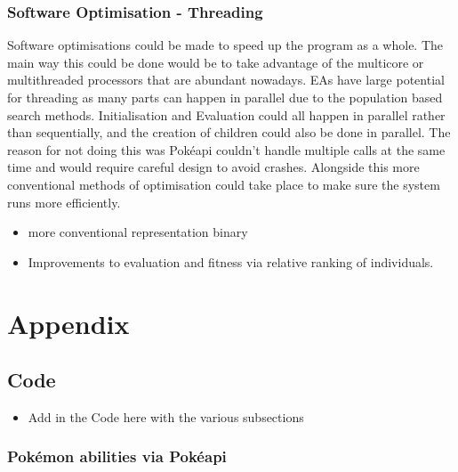 \documentclass[a4paper]{article}
\newcommand{\Pokemon}{Pok\'{e}mon}
\newcommand{\Pokeapi}{Pok\'{e}api}
\begin{document}
\subsubsection{Software Optimisation - Threading}
\par
Software optimisations could be made to speed up the program as a whole.
The main way this could be done would be to take advantage of the multicore or multithreaded processors that are abundant nowadays.
EAs have large potential for threading as many parts can happen in parallel due to the population based search methods.
Initialisation and Evaluation could all happen in parallel rather than sequentially, and the creation of children could also be done in parallel.
The reason for not doing this was \Pokeapi{} couldn't handle multiple calls at the same time and would require careful design to avoid crashes.
Alongside this more conventional methods of optimisation could take place to make sure the system runs more efficiently.
\\ \par
\begin{itemize}
	\item more conventional representation binary
	\item Improvements to evaluation and fitness via relative ranking of individuals.
\end{itemize}

\pagebreak
\section{Appendix}
\subsection{Code}
\begin{itemize}
	\item Add in the Code here with the various subsections
\end{itemize}
\subsubsection{\Pokemon{} abilities via \Pokeapi{}}

\end{document}
